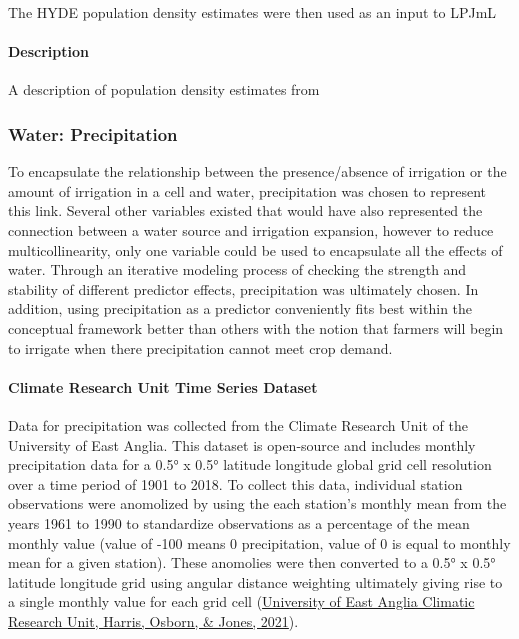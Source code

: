 \documentclass[12pt,twoside]{reedthesis}
\begin{document}
The HYDE population density estimates were then used as an input to LPJmL

\hypertarget{popdensdesc}{%
\paragraph{Description}\label{popdensdesc}}

A description of population density estimates from

\hypertarget{precip}{%
\subsubsection{Water: Precipitation}\label{precip}}

To encapsulate the relationship between the presence/absence of irrigation or the amount of irrigation in a cell and water, precipitation was chosen to represent this link. Several other variables existed that would have also represented the connection between a water source and irrigation expansion, however to reduce multicollinearity, only one variable could be used to encapsulate all the effects of water. Through an iterative modeling process of checking the strength and stability of different predictor effects, precipitation was ultimately chosen. In addition, using precipitation as a predictor conveniently fits best within the conceptual framework better than others with the notion that farmers will begin to irrigate when there precipitation cannot meet crop demand.

\hypertarget{CRU}{%
\paragraph{Climate Research Unit Time Series Dataset}\label{CRU}}

Data for precipitation was collected from the Climate Research Unit of the University of East Anglia. This dataset is open-source and includes monthly precipitation data for a 0.5° x 0.5° latitude longitude global grid cell resolution over a time period of 1901 to 2018. To collect this data, individual station observations were anomolized by using the each station's monthly mean from the years 1961 to 1990 to standardize observations as a percentage of the mean monthly value (value of -100 means 0 precipitation, value of 0 is equal to monthly mean for a given station). These anomolies were then converted to a 0.5° x 0.5° latitude longitude grid using angular distance weighting ultimately giving rise to a single monthly value for each grid cell (\protect\hyperlink{ref-universityofeastangliaclimaticresearchunitVersionCRUTS2021}{University of East Anglia Climatic Research Unit, Harris, Osborn, \& Jones, 2021}).
\end{document}
